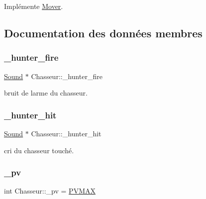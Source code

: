 Implémente \hyperlink{classMover_a77684ae3483af98c82c9488ef3e80f05}{Mover}.



\subsection{Documentation des données membres}
\mbox{\label{classChasseur_aec2e8b81e3f949dc7840bfcab9c3799a}} 
\subsubsection{\texorpdfstring{\+\_\+hunter\+\_\+fire}{\_hunter\_fire}}
{\footnotesize\ttfamily \hyperlink{classSound}{Sound} $\ast$ Chasseur\+::\+\_\+hunter\+\_\+fire\hspace{0.3cm}{\ttfamily [static]}}



bruit de l\textquotesingle{}arme du chasseur. 

\mbox{\label{classChasseur_ab468d04c50ea338d604e87d5f6db3801}} 
\subsubsection{\texorpdfstring{\+\_\+hunter\+\_\+hit}{\_hunter\_hit}}
{\footnotesize\ttfamily \hyperlink{classSound}{Sound} $\ast$ Chasseur\+::\+\_\+hunter\+\_\+hit\hspace{0.3cm}{\ttfamily [static]}}



cri du chasseur touché. 

\mbox{\label{classChasseur_a3c8f5b959145976c4d110a5a583791ab}} 
\subsubsection{\texorpdfstring{\+\_\+pv}{\_pv}}
{\footnotesize\ttfamily int Chasseur\+::\+\_\+pv = \hyperlink{classChasseur_a7b7fed3026976e62f8f730cc71c5b2db}{P\+V\+M\+AX}\hspace{0.3cm}{\ttfamily [private]}}



